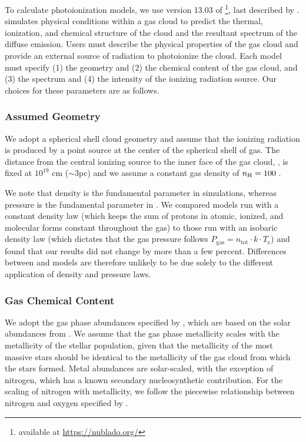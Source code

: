 To calculate photoionization models, we use version 13.03 of \Cloudy\footnote{available at \url{https://nublado.org/}}, last described by \citet{Ferland13}. \Cloudy simulates physical conditions within a gas cloud to predict the thermal, ionization, and chemical structure of the cloud and the resultant spectrum of the diffuse emission. Users must describe the physical properties of the gas cloud and provide an external source of radiation to photoionize the cloud. Each model must specify (1) the geometry and (2) the chemical content of the gas cloud, and (3) the spectrum and (4) the intensity of the ionizing radiation source. Our choices for these parameters are as follows.

\subsubsection{Assumed Geometry}\label{sec:methods:cloudy:geom}


We adopt a spherical shell cloud geometry and assume that the ionizing radiation is produced by a point source at the center of the spherical shell of gas. The distance from the central ionizing source to the inner face of the gas cloud, \Rin, is fixed at $10^{19}$ cm ($\sim 3$pc) and we assume a constant gas density of $n_{\mathrm{H}}=100\;$.

We note that density is the fundamental parameter in \Cloudy simulations, whereas pressure is the fundamental parameter in \Mappings. We compared \Cloudy models run with a constant density law (which keeps the sum of protons in atomic, ionized, and molecular forms constant throughout the gas) to those run with an isobaric density law (which dictates that the gas pressure follows $P_{\mathrm{gas}} = n_{\mathrm{tot}} \cdot k \cdot T_{\mathrm{e}}$) and found that our results did not change by more than a few percent. Differences between \Mappings and \Cloudy models are therefore unlikely to be due solely to the different application of density and pressure laws.

\subsubsection{Gas Chemical Content}\label{sec:methods:cloudy:abund}

We adopt the gas phase abundances specified by \citet{Dopita00}, which are based on the solar abundances from \citet{AndersGrev89}. We assume that the gas phase metallicity scales with the metallicity of the stellar population, given that the metallicity of the most massive stars should be identical to the metallicity of the gas cloud from which the stars formed. Metal abundances are solar-scaled, with the exception of nitrogen, which has a known secondary nucleosynthetic contribution. For the scaling of nitrogen with metallicity, we follow the piecewise relationship between nitrogen and oxygen specified by \citet{Dopita00}.


